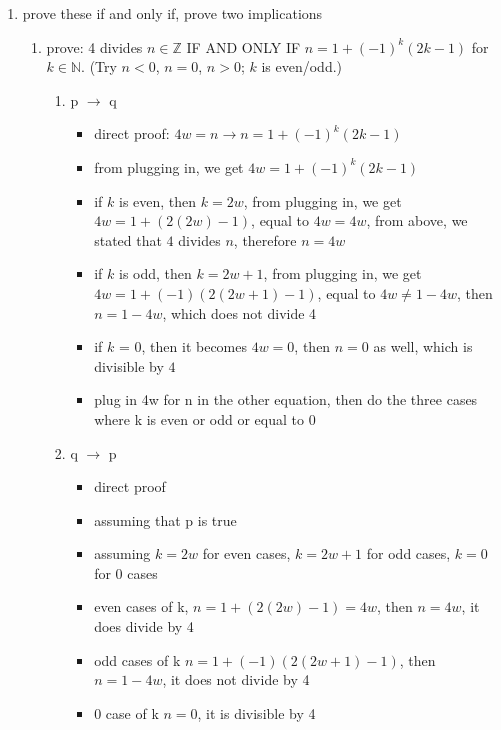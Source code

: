 \documentclass[12pt]{article}
\begin{document}
\begin{enumerate}
        \item prove these if and only if, prove two implications
        \begin{enumerate}
            \item prove: 4 divides $n \in \mathbb{Z}$ IF AND ONLY IF $n = 1 + (-1)^k(2k-1)$ for $k \in \mathbb{N}$. (Try $n < 0$, $n = 0$, $n > 0$; $k$ is even/odd.)
            \begin{enumerate}
                \item p $\rightarrow$ q
                \begin{itemize}
                    \item direct proof: $4w = n \rightarrow n = 1 + (-1)^k(2k-1)$ 
                    \item from plugging in, we get $4w = 1 + (-1)^k(2k-1)$
                    \item if $k$ is even, then $k = 2w$, from plugging in, we get $4w = 1 + (2(2w) - 1)$, equal to $4w = 4w$, from above, we stated that $4$ divides $n$, therefore $n = 4w$
                    \item if $k$ is odd, then $k = 2w + 1$, from plugging in, we get $4w = 1 + (-1)(2(2w+1)-1)$, equal to $4w \neq 1-4w$, then $n = 1-4w$, which does not divide 4
                    \item if $k$ = 0, then it becomes $4w = 0$, then $n = 0$ as well, which is divisible by $4$
                    \item plug in 4w for n in the other equation, then do the three cases where k is even or odd or equal to 0
                \end{itemize}
                \item q $\rightarrow$ p
                \begin{itemize}
                    \item direct proof
                    \item assuming that p is true
                    \item assuming $k = 2w$ for even cases, $k = 2w+1$ for odd cases, $k = 0$ for 0 cases
                    \item even cases of k, $n = 1 + (2(2w) - 1) = 4w$, then $n = 4w$, it does divide by 4
                    \item odd cases of k $n = 1 + (-1)(2(2w+1) -1)$, then $n = 1-4w$, it does not divide by 4
                    \item 0 case of k $n = 0$, it is divisible by 4
                \end{itemize}
            \end{enumerate}
        \end{enumerate}
        

\end{enumerate}
\end{document}
